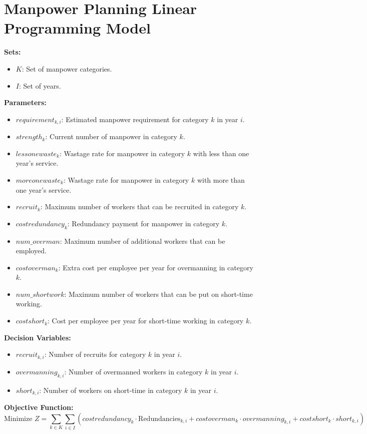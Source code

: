 \documentclass{article}
\begin{document}
\section*{Manpower Planning Linear Programming Model}

\textbf{Sets:}
\begin{itemize}
    \item $K$: Set of manpower categories.
    \item $I$: Set of years.
\end{itemize}

\textbf{Parameters:}
\begin{itemize}
    \item $requirement_{k,i}$: Estimated manpower requirement for category $k$ in year $i$.
    \item $strength_k$: Current number of manpower in category $k$.
    \item $lessonewaste_k$: Wastage rate for manpower in category $k$ with less than one year's service.
    \item $moreonewaste_k$: Wastage rate for manpower in category $k$ with more than one year's service.
    \item $recruit_k$: Maximum number of workers that can be recruited in category $k$.
    \item $costredundancy_k$: Redundancy payment for manpower in category $k$.
    \item $num\_overman$: Maximum number of additional workers that can be employed.
    \item $costoverman_k$: Extra cost per employee per year for overmanning in category $k$.
    \item $num\_shortwork$: Maximum number of workers that can be put on short-time working.
    \item $costshort_k$: Cost per employee per year for short-time working in category $k$.
\end{itemize}

\textbf{Decision Variables:}
\begin{itemize}
    \item $recruit_{k,i}$: Number of recruits for category $k$ in year $i$.
    \item $overmanning_{k,i}$: Number of overmanned workers in category $k$ in year $i$.
    \item $short_{k,i}$: Number of workers on short-time in category $k$ in year $i$.
\end{itemize}

\textbf{Objective Function:}
\begin{equation}
\text{Minimize } Z = \sum_{k \in K} \sum_{i \in I} (costredundancy_k \cdot \text{Redundancies}_{k,i} + costoverman_k \cdot overmanning_{k,i} + costshort_k \cdot short_{k,i}) 
\end{equation}
\end{document}
